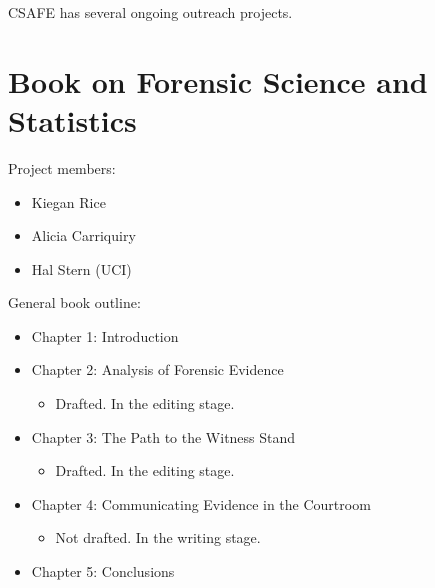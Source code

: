 \documentclass[]{book}
\providecommand{\tightlist}{%
  \setlength{\itemsep}{0pt}\setlength{\parskip}{0pt}}
\begin{document}
CSAFE has several ongoing outreach projects.

\hypertarget{book-on-forensic-science-and-statistics}{%
\section{Book on Forensic Science and Statistics}\label{book-on-forensic-science-and-statistics}}

Project members:

\begin{itemize}
\tightlist
\item
  Kiegan Rice\\
\item
  Alicia Carriquiry\\
\item
  Hal Stern (UCI)
\end{itemize}

General book outline:

\begin{itemize}
\tightlist
\item
  Chapter 1: Introduction\\
\item
  Chapter 2: Analysis of Forensic Evidence

  \begin{itemize}
  \tightlist
  \item
    Drafted. In the editing stage.
  \end{itemize}
\item
  Chapter 3: The Path to the Witness Stand

  \begin{itemize}
  \tightlist
  \item
    Drafted. In the editing stage.
  \end{itemize}
\item
  Chapter 4: Communicating Evidence in the Courtroom

  \begin{itemize}
  \tightlist
  \item
    Not drafted. In the writing stage.
  \end{itemize}
\item
  Chapter 5: Conclusions
\end{itemize}


\end{document}
